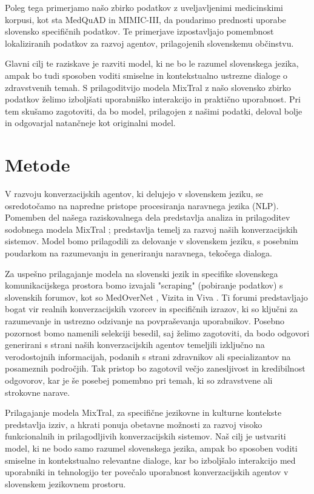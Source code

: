 \documentclass[fleqn,moreauthors,10pt]{ds_report}
\begin{document}
Poleg tega primerjamo našo zbirko podatkov z uveljavljenimi medicinskimi korpusi, kot sta MedQuAD in MIMIC-III, da poudarimo prednosti uporabe slovensko specifičnih podatkov. Te primerjave izpostavljajo pomembnost lokaliziranih podatkov za razvoj agentov, prilagojenih slovenskemu ob\-čin\-st\-vu.

Glavni cilj te raziskave je razviti model, ki ne bo le ra\-zu\-mel slovenskega jezika, ampak bo tudi sposoben voditi smiselne in kontekstualno ustrezne dialoge o zdravstvenih temah. S prilagoditvijo modela MixTral z našo slovensko zbirko podatkov želimo izboljšati uporabniško interakcijo in praktično uporabnost. Pri tem skušamo zagotoviti, da bo model, prilagojen z našimi podatki, deloval bolje in odgovarjal natančneje kot originalni model.


\section*{Metode}
V razvoju konverzacijskih agentov, ki delujejo v slovenskem jeziku, se osredotočamo na napredne pristope procesiranja naravnega jezika (NLP). Pomemben del našega raziskovalnega dela predstavlja analiza in prilagoditev sodobnega modela MixTral \cite{jiang2024mixtral}; predstavlja temelj za razvoj naših konverzacijskih sistemov. Model bomo prilagodili za delovanje v slo\-ven\-skem jeziku, s posebnim poudarkom na razumevanju in generiranju naravnega, tekočega dialoga.

Za uspešno prilagajanje modela na slovenski jezik in specifike slovenskega komunikacijskega prostora bomo izvajali "scraping" (pobiranje podatkov) s slovenskih forumov, kot so MedOverNet \cite{medovernet}, Vizita \cite{vizita} in Viva \cite{viva}. Ti forumi predstavljajo bogat vir realnih konverzacijskih vzorcev in specifičnih izrazov, ki so ključni za razumevanje in ustrezno odzivanje na povpraševanja uporabnikov. Posebno pozornost bomo namenili selekciji besedil, saj želimo zagotoviti, da bodo odgovori generirani s strani naših konverzacijskih agentov temeljili izključno na verodostojnih informacijah, podanih s strani zdravnikov ali specializantov na posameznih področjih. Tak pristop bo zagotovil večjo zanesljivost in kredibilnost odgovorov, kar je še posebej pomembno pri temah, ki so zdravstvene ali strokovne narave.

Prilagajanje modela MixTral, za specifične jezikovne in kulturne kontekste predstavlja izziv, a hkrati ponuja obetavne možnosti za razvoj visoko funkcionalnih in prilagodljivih konverzacijskih sistemov. Naš cilj je ustvariti model, ki ne bodo samo razumel slovenskega jezika, ampak bo sposoben voditi smiselne in kontekstualno relevantne dialoge, kar bo izboljšalo interakcijo med uporabniki in tehnologijo ter povečalo uporabnost konverzacijskih agentov v slovenskem jezikovnem prostoru.
\end{document}
